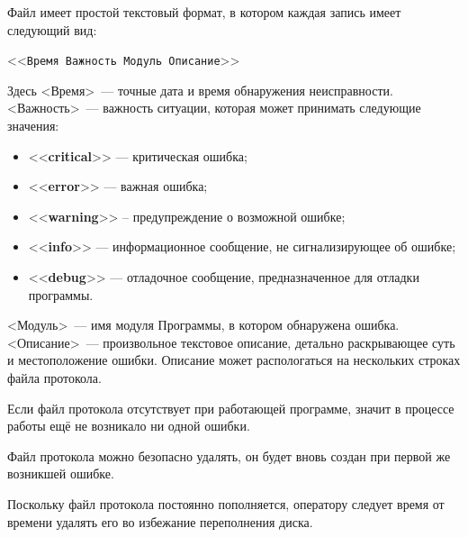 \documentclass[12pt, a4paper, twocolumn]{report}
\newcommand{\CTL}[1]{<<{\bf #1}>>}
\newcommand{\CMD}[1]{<<{\tt #1}>>}
\begin{document}
Файл имеет простой текстовый формат, в котором каждая запись имеет следующий вид:

\CMD{Время Важность Модуль Описание}

Здесь <Время>~--- точные дата и время обнаружения неисправности. <Важность>~--- важность ситуации, которая может принимать следующие значения:

\begin{itemize}
\item \CTL{critical} --- критическая ошибка;
\item \CTL{error} --- важная ошибка;
\item \CTL{warning} -- предупреждение о возможной ошибке;
\item \CTL{info} --- информационное сообщение, не сигнализирующее об ошибке;
\item \CTL{debug} --- отладочное сообщение, предназначенное для отладки программы.
\end{itemize}

<Модуль>~--- имя модуля Программы, в котором обнаружена ошибка. <Описание>~--- произвольное текстовое описание, детально раскрывающее суть и местоположение ошибки. Описание может распологаться на нескольких строках файла протокола.

Если файл протокола отсутствует при работающей программе, значит в процессе работы ещё не возникало ни одной ошибки.

Файл протокола можно безопасно удалять, он будет вновь создан при первой же возникшей ошибке.

Поскольку файл протокола постоянно пополняется, оператору следует время от времени удалять его во избежание переполнения диска.
\end{document}
